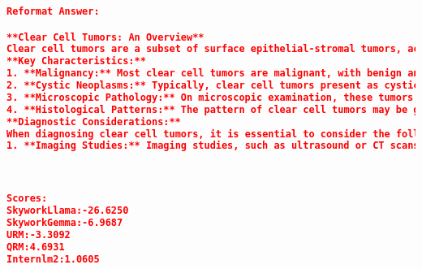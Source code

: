 \begin{lstlisting}[language=json,numbers=none]
Reformat Answer:

**Clear Cell Tumors: An Overview**
Clear cell tumors are a subset of surface epithelial-stromal tumors, accounting for approximately 6% of ovarian cancer cases. These neoplasms can also occur in the pancreas and salivary glands.
**Key Characteristics:**
1. **Malignancy:** Most clear cell tumors are malignant, with benign and borderline variants being rare.
2. **Cystic Neoplasms:** Typically, clear cell tumors present as cystic neoplasms with polypoid masses that protrude into the cyst.
3. **Microscopic Pathology:** On microscopic examination, these tumors are composed of cells with clear cytoplasm, which contains glycogen. Hobnail cells, characterized by the secretion of glycogen, are also present.
4. **Histological Patterns:** The pattern of clear cell tumors may be glandular, papillary, or solid.
**Diagnostic Considerations:**
When diagnosing clear cell tumors, it is essential to consider the following:
1. **Imaging Studies:** Imaging studies, such as ultrasound or CT scans, can help identify the presence of cystic neoplasms with polypoid masses.



Scores:
SkyworkLlama:-26.6250
SkyworkGemma:-6.9687
URM:-3.3092
QRM:4.6931
Internlm2:1.0605
\end{lstlisting}